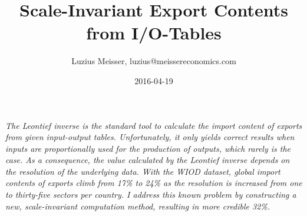 \documentclass[english]{uzhpub}
\begin{document}
\title{Scale-Invariant Export Contents from I/O-Tables}


\author{Luzius Meisser, luzius@meissereconomics.com}

\date{2016-04-19}

\maketitle


\emph{The Leontief inverse is the standard tool to calculate the import content of exports from given input-output tables. Unfortunately, it only yields correct results when inputs are proportionally used for the production of outputs, which rarely is the case. As a consequence, the value calculated by the Leontief inverse depends on the resolution of the underlying data. With the WIOD dataset, global import contents of exports climb from 17\% to 24\% as the resolution is increased from one to thirty-five sectors per country. I address this known problem by constructing a new, scale-invariant computation method, resulting in more credible 32\%.}
\end{document}
